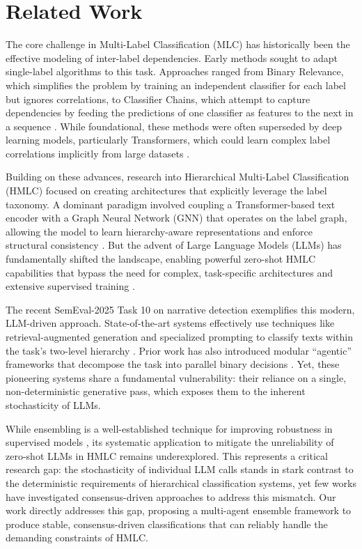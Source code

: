 \section{Related Work}

The core challenge in Multi-Label Classification (MLC) has historically been the effective modeling of inter-label dependencies. 
Early methods sought to adapt single-label algorithms to this task. 
Approaches ranged from Binary Relevance, which simplifies the problem by training an independent classifier for each label but ignores correlations, to Classifier Chains, which attempt to capture dependencies by feeding the predictions of one classifier as features to the next in a sequence \citep{zhang_binary_2018,Read2011}. While foundational, these methods were often superseded by deep learning models, particularly Transformers, which could learn complex label correlations implicitly from large datasets \citep{devlin_bert_2019}.

Building on these advances, research into Hierarchical Multi-Label Classification (HMLC) focused on creating architectures that explicitly leverage the label taxonomy. A dominant paradigm involved coupling a Transformer-based text encoder with a Graph Neural Network (GNN) that operates on the label graph, allowing the model to learn hierarchy-aware representations and enforce structural consistency \citep{zhou-etal-2020-hierarchy,xu-etal-2021-hierarchical}. 
But the advent of Large Language Models (LLMs) has fundamentally shifted the landscape, enabling powerful zero-shot HMLC capabilities that bypass the need for complex, task-specific architectures and extensive supervised training \citep{wang-etal-2023-text2topic}.

The recent SemEval-2025 Task 10 on narrative detection \citep{semeval2025task10} exemplifies this modern, LLM-driven approach. 
State-of-the-art systems effectively use techniques like retrieval-augmented generation and specialized prompting to classify texts within the task's two-level hierarchy \citep{singh-etal-2025-gatenlp,younus-qureshi-2025-nlptuducd}. 
Prior work has also introduced modular ``agentic'' frameworks that decompose the task into parallel binary decisions \citep{eljadiri-nurbakova-2025-team}. 
Yet, these pioneering systems share a fundamental vulnerability: their reliance on a single, non-deterministic generative pass, which exposes them to the inherent stochasticity of LLMs. 

While ensembling is a well-established technique for improving robustness in supervised models \citep{jurkiewicz-etal-2020-applicaai}, its systematic application to mitigate the unreliability of zero-shot LLMs in HMLC remains underexplored. 
This represents a critical research gap: the stochasticity of individual LLM calls stands in stark contrast to the deterministic requirements of hierarchical classification systems, yet few works have investigated consensus-driven approaches to address this mismatch. 
Our work directly addresses this gap, proposing a multi-agent ensemble framework to produce stable, consensus-driven classifications that can reliably handle the demanding constraints of HMLC.
